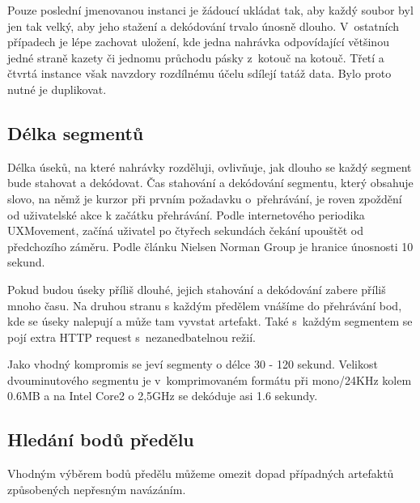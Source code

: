 Pouze poslední jmenovanou instanci je žádoucí ukládat tak, aby každý soubor byl
jen tak velký, aby jeho stažení a dekódování trvalo únosně dlouho. V~ostatních
případech je lépe zachovat uložení, kde jedna nahrávka odpovídající většinou
jedné straně kazety či jednomu průchodu pásky z~kotouč na kotouč. Třetí a čtvrtá
instance však navzdory rozdílnému účelu sdílejí tatáž data. Bylo proto nutné je
duplikovat.

\subsection{Délka segmentů}

Délka úseků, na které nahrávky rozděluji, ovlivňuje, jak dlouho se každý segment
bude stahovat a dekódovat. Čas stahování a dekódování segmentu, který obsahuje
slovo, na němž je kurzor při prvním požadavku o~přehrávání, je roven zpoždění od
uživatelské akce k začátku přehrávání. Podle internetového periodika
UXMovement\cite{foursecondrule}, začíná uživatel po čtyřech sekundách čekání
upouštět od předchozího záměru. Podle článku Nielsen Norman
Group\cite{websiteresponsetimes} je hranice únosnosti 10 sekund.

Pokud budou úseky příliš dlouhé, jejich stahování a dekódování zabere příliš
mnoho času. Na druhou stranu s každým předělem vnášíme do přehrávání bod, kde se
úseky nalepují a může tam vyvstat artefakt. Také s~každým segmentem se pojí
extra HTTP request s~nezanedbatelnou režií.

Jako vhodný kompromis se jeví segmenty o délce 30 - 120 sekund. Velikost
dvouminutového segmentu je v~komprimovaném formátu při mono/24KHz kolem 0.6MB a
na Intel Core2 o 2,5GHz se dekóduje asi 1.6 sekundy.

\subsection{Hledání bodů předělu}

Vhodným výběrem bodů předělu můžeme omezit dopad případných artefaktů
způsobených nepřesným navázáním.

